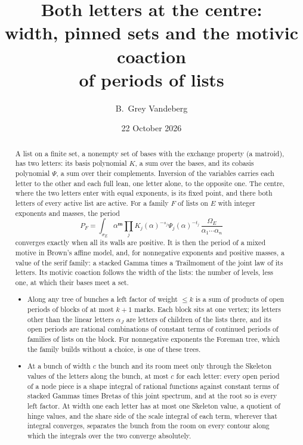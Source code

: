\documentclass[11pt]{article}
\title{Both letters at the centre:\\ width, pinned sets and the motivic coaction\\ of periods of lists}
\author{B.~Grey Vandeberg}
\date{22 October 2026}
\theoremstyle{plain}
\theoremstyle{definition}
\theoremstyle{remark}
\newcommand{\bm}{\mathbf m}
\begin{document}
\maketitle

\begin{abstract}
A list on a finite set, a nonempty set of bases with the exchange property (a matroid), has two letters: its basis polynomial $K$, a sum over the bases, and its cobasis polynomial $\Psi$, a sum over their complements. Inversion of the variables carries each letter to the other and each full lean, one letter alone, to the opposite one. The centre, where the two letters enter with equal exponents, is its fixed point, and there both letters of every active list are active. For a family $F$ of lists on $E$ with integer exponents and masses, the period
\[
P_F=\int_{\sigma_E}\alpha^{\bm}\prod_jK_j(\alpha)^{-s_j}\Psi_j(\alpha)^{-t_j}\,\frac{\Omega_E}{\alpha_1\cdots\alpha_n}
\]
converges exactly when all its walls are positive. It is then the period of a mixed motive in Brown's affine model, and, for nonnegative exponents and positive masses, a value of the serif family: a stacked Gamma times a Trailmoment of the joint law of its letters. Its motivic coaction follows the width of the lists: the number of levels, less one, at which their bases meet a set.
\begin{itemize}
\item[(A)] Along any tree of bunches a left factor of weight $\le k$ is a sum of products of open periods of blocks of at most $k+1$ marks. Each block sits at one vertex; its letters other than the linear letters $\alpha_J$ are letters of children of the lists there, and its open periods are rational combinations of constant terms of continued periods of families of lists on the block. For nonnegative exponents the Foreman tree, which the family builds without a choice, is one of these trees.
\item[(B)] At a bunch of width $c$ the bunch and its room meet only through the Skeleton values of the letters along the bunch, at most $c$ for each letter: every open period of a node piece is a shape integral of rational functions against constant terms of stacked Gammas times Bretas of this joint spectrum, and at the root so is every left factor. At width one each letter has at most one Skeleton value, a quotient of hinge values, and the share side of the scale integral of each term, wherever that integral converges, separates the bunch from the room on every contour along which the integrals over the two converge absolutely.

\end{itemize}
\end{abstract}
\end{document}
